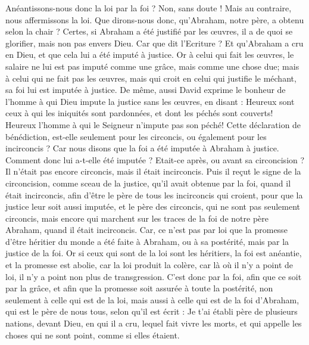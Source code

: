 \begin{multicols}{2}
Anéantissons-nous donc la loi par la foi ? Non, sans doute ! Mais au contraire, nous affermissons la loi.
\VerseOne{}Que dirons-nous donc, qu'Abraham, notre père, a obtenu selon la chair ?
Certes, si Abraham a été justifié par les œuvres, il a de quoi se glorifier, mais non pas envers Dieu.
Car que dit l'Ecriture ? Et qu'Abraham a cru en Dieu, et que cela lui a été imputé à justice.
Or à celui qui fait les œuvres, le salaire ne lui est pas imputé comme une grâce, mais comme une chose due;
mais à celui qui ne fait pas les œuvres, mais qui croit en celui qui justifie le méchant, sa foi lui est imputée à justice.
De même, aussi David exprime le bonheur de l'homme à qui Dieu impute la justice sans les œuvres, en disant :
Heureux sont ceux à qui les iniquités sont pardonnées, et dont les péchés sont couverts!
Heureux l'homme à qui le Seigneur n'impute pas son péché!
Cette déclaration de bénédiction, est-elle seulement pour les circoncis, ou également pour les incirconcis ? Car nous disons que la foi a été imputée à Abraham à justice.
Comment donc lui a-t-elle été imputée ? Etait-ce après, ou avant sa circoncision ? Il n'était pas encore circoncis, mais il était incirconcis.
Puis il reçut le signe de la circoncision, comme sceau de la justice, qu'il avait obtenue par la foi, quand il était incirconcis, afin d'être le père de tous les incirconcis qui croient, pour que la justice leur soit aussi imputée,
et le père des circoncis, qui ne sont pas seulement circoncis, mais encore qui marchent sur les traces de la foi de notre père Abraham, quand il était incirconcis.
Car, ce n'est pas par loi que la promesse d'être héritier du monde a été faite à Abraham, ou à sa postérité, mais par la justice de la foi.
Or si ceux qui sont de la loi sont les héritiers, la foi est anéantie, et la promesse est abolie,
car la loi produit la colère, car là où il n'y a point de loi, il n'y a point non plus de transgression.
C'est donc par la foi, afin que ce soit par la grâce, et afin que la promesse soit assurée à toute la postérité, non seulement à celle qui est de la loi, mais aussi à celle qui est de la foi d'Abraham, qui est le père de nous tous,
selon qu'il est écrit : Je t'ai établi père de plusieurs nations, devant Dieu, en qui il a cru, lequel fait vivre les morts, et qui appelle les choses qui ne sont point, comme si elles étaient.

\end{multicols}
